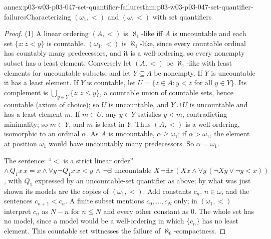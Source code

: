 \begin{annexitem}{annex:p03-w03-p03-047-set-quantifier-failures}{thm:p03-w03-p03-047-set-quantifier-failures}{Characterizing \((\omega_1,<)\) and \((\omega,<)\) with set quantifiers}
\begin{proof}
(1) A linear ordering \((A,<)\) is \(\aleph_1\)-like iff \(A\) is
uncountable and each set \(\{z:z<y\}\) is countable.  \((\omega_1,<)\) is
\(\aleph_1\)-like, since every countable ordinal has countably many
predecessors, and it is a well-ordering, so every nonempty subset has a least
element.  Conversely let \((A,<)\) be \(\aleph_1\)-like with least elements
for uncountable subsets, and let \(Y\subseteq A\) be nonempty.  If \(Y\) is
uncountable it has a least element.  If \(Y\) is countable, let
\(U=\{z\in A:y<z\text{ for all }y\in Y\}\).  Its complement is
\(\bigcup_{y\in Y}\{z:z\le y\}\), a countable union of countable sets, hence
countable (axiom of choice); so \(U\) is uncountable, and \(Y\cup U\) is
uncountable and has a least element \(m\).  If \(m\in U\), any \(y\in Y\)
satisfies \(y<m\), contradicting minimality; so \(m\in Y\), and \(m\) is
least in \(Y\).  Thus \((A,<)\) is a well-ordering, isomorphic to an ordinal
\(\alpha\).  As \(A\) is uncountable, \(\alpha\ge\omega_1\); if
\(\alpha>\omega_1\), the element at position \(\omega_1\) would have
uncountably many predecessors.  So \(\alpha=\omega_1\).

The sentence: ``\(<\) is a strict linear order''
\(\land\,Q_1x\,x=x\land\forall y\,\neg Q_1x\,x<y\,\land\,
\neg\exists\text{ uncountable }X\,\neg\exists x\,(Xx\land\forall y\,(\neg Xy\lor\neg y<x))\),
with \(Q_1\) expressed by an uncountable-set quantifier as above; by what was
just shown its models are the copies of \((\omega_1,<)\).  Add constants
\(c_n\), \(n\in\omega\), and the sentences \(c_{n+1}<c_n\).  A finite subset
mentions \(c_0,\ldots,c_N\) only; in \((\omega_1,<)\) interpret \(c_n\) as
\(N-n\) for \(n\le N\) and every other constant as \(0\).  The whole set has no
model, since a model would be a well-ordering in which \(\{c_n\}\) has no
least element.  This countable set witnesses the failure of
\(\aleph_0\)-compactness.


\end{proof}
\end{annexitem}
